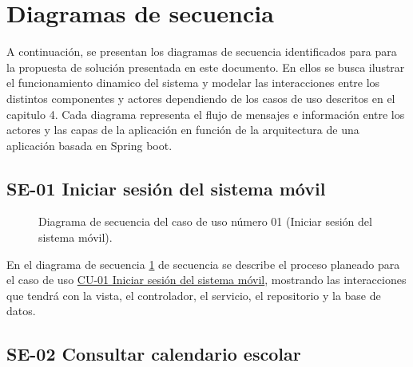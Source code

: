 \section{Diagramas de secuencia}

A continuación, se presentan los diagramas de secuencia identificados para para la propuesta de solución presentada en este documento.
En ellos se busca ilustrar el funcionamiento dinamico del sistema y modelar las interacciones entre los distintos componentes y actores dependiendo de los casos de uso descritos en el capitulo 4. 
Cada diagrama representa el flujo de mensajes e información entre los actores y las capas de la aplicación en función de la arquitectura de una aplicación basada en Spring boot.

\newpage

\subsection{SE-01 Iniciar sesión del sistema móvil}

\begin{figure}[htbp!]
	\begin{center}
		\caption{Diagrama de secuencia del caso de uso número 01 (Iniciar sesión del sistema móvil).}
		\label{fig:Diagrama de secuencia CU-01}
	\end{center}
\end{figure}

En el diagrama de secuencia \ref{fig:Diagrama de secuencia CU-01} de secuencia se describe el proceso planeado para el caso de uso \hyperlink{CU-01}{CU-01 Iniciar sesión del sistema móvil}, mostrando las interacciones que tendrá con la vista, el controlador, el servicio, el repositorio y la base de datos.

\newpage

\subsection{SE-02 Consultar calendario escolar}

